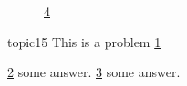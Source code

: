 \documentclass{exam}
\begin{document}
\begin{figure}
	\label{fig1}
\end{figure}

\begin{figure}
	\label{fig2}
\end{figure}

\begin{figure}
	\label{fig3}
	\ref{fig4}
\end{figure}

\begin{figure}
	\label{fig4}
\end{figure}

\begin{problem}{topic}{15}
	This is a problem
	\ref{fig1}
	\begin{answers}
		\answer[correct] \ref{fig2} some answer.
		\answer \ref{fig3} some answer.
	\end{answers}
\end{problem}
\end{document}
